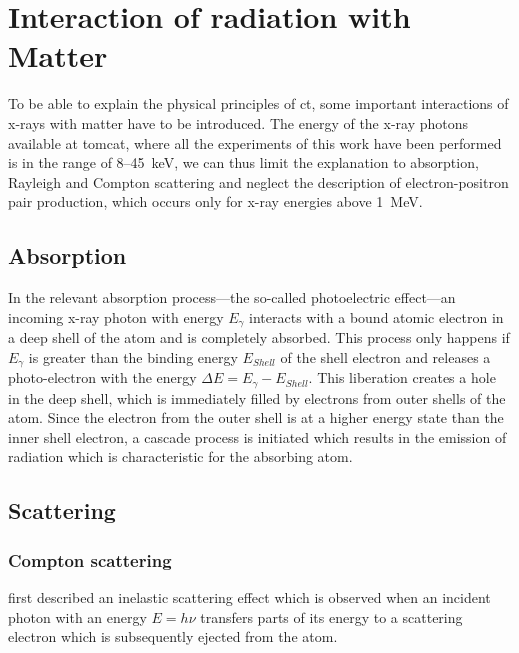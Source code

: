 \section{Interaction of radiation with Matter}
To be able to explain the physical principles of \ac{ct}, some important interactions of x-rays with matter have to be introduced. The energy of the x-ray photons available at \ac{tomcat}, where all the experiments of this work have been performed is in the range of 8--\SI{45}{\kilo\electronvolt}, we can thus limit the explanation to absorption, Rayleigh and Compton scattering and neglect the description of electron-positron pair production, which occurs only for x-ray energies above \SI{1}{\mega\electronvolt}.

\subsection{Absorption}\label{sec:absorption}
In the relevant absorption process---the so-called photoelectric effect---an incoming x-ray photon with energy $E_{\gamma}$ interacts with a bound atomic electron in a deep shell of the atom and is completely absorbed. This process only happens if $E_{\gamma}$ is greater than the binding energy $E_{Shell}$ of the shell electron and releases a photo-electron with the energy $\Delta E=E_{\gamma}-E_{Shell}$. This liberation creates a hole in the deep shell, which is immediately filled by electrons from outer shells of the atom. Since the electron from the outer shell is at a higher energy state than the inner shell electron, a cascade process is initiated which results in the emission of radiation which is characteristic for the absorbing atom.

\subsection{Scattering}
\subsubsection{Compton scattering}
\citet{Compton1923} first described an inelastic scattering effect which is observed when an incident photon with an energy $E=h\nu$ transfers parts of its energy to a scattering electron which is subsequently ejected from the atom.

